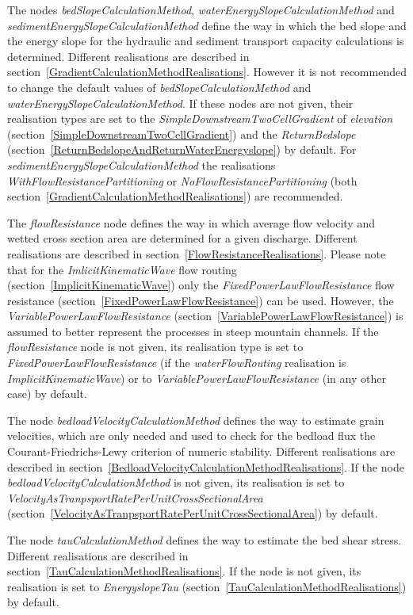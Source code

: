 \documentclass[11pt,a4paper]{article}
\begin{document}
The nodes \emph{bedSlopeCalculationMethod}, \emph{waterEnergySlopeCalculationMethod} and \emph{sedimentEnergySlopeCalculationMethod} define the way in which the bed slope and the energy slope for the hydraulic and sediment transport capacity calculations is determined. Different realisations are described in section~\ref{GradientCalculationMethodRealisations}. However it is not recommended to change the default values of \emph{bedSlopeCalculationMethod} and \emph{waterEnergySlopeCalculationMethod}. If these nodes are not given, their realisation types are set to the \emph{SimpleDownstreamTwoCellGradient} of \emph{elevation} (section~\ref{SimpleDownstreamTwoCellGradient}) and the \emph{ReturnBedslope} (section~\ref{ReturnBedslopeAndReturnWaterEnergyslope}) by default. For \emph{sedimentEnergySlopeCalculationMethod} the realisations \emph{WithFlowResistancePartitioning} or \emph{NoFlowResistancePartitioning} (both section~\ref{GradientCalculationMethodRealisations}) are recommended.

The \emph{flowResistance} node defines the way in which average flow velocity and wetted cross section area are determined for a given discharge. Different realisations are described in section~\ref{FlowResistanceRealisations}. Please note that for the \emph{ImlicitKinematicWave} flow routing (section~\ref{ImplicitKinematicWave}) only the \emph{FixedPowerLawFlowResistance} flow resistance (section~\ref{FixedPowerLawFlowResistance}) can be used. However, the \emph{VariablePowerLawFlowResistance} (section~\ref{VariablePowerLawFlowResistance}) is assumed to better represent the processes in steep mountain channels. If the \emph{flowResistance} node is not given, its realisation type is set to \emph{FixedPowerLawFlowResistance} (if the \emph{waterFlowRouting} realisation is \emph{ImplicitKinematicWave}) or to \emph{VariablePowerLawFlowResistance} (in any other case) by default.

The node \emph{bedloadVelocityCalculationMethod} defines the way to estimate grain velocities, which are only needed and used to check for the bedload flux the Courant-Friedrichs-Lewy criterion of numeric stability. Different realisations are described in section~\ref{BedloadVelocityCalculationMethodRealisations}. If the node \emph{bedloadVelocityCalculationMethod} is not given, its realisation is set to \emph{VelocityAsTranpsportRatePerUnitCrossSectionalArea} (section~\ref{VelocityAsTranpsportRatePerUnitCrossSectionalArea}) by default.

The node \emph{tauCalculationMethod} defines the way to estimate the bed shear stress. Different realisations are described in section~\ref{TauCalculationMethodRealisations}. If the node is not given, its realisation is set to \emph{EnergyslopeTau} (section~\ref{TauCalculationMethodRealisations}) by default.
\end{document}
